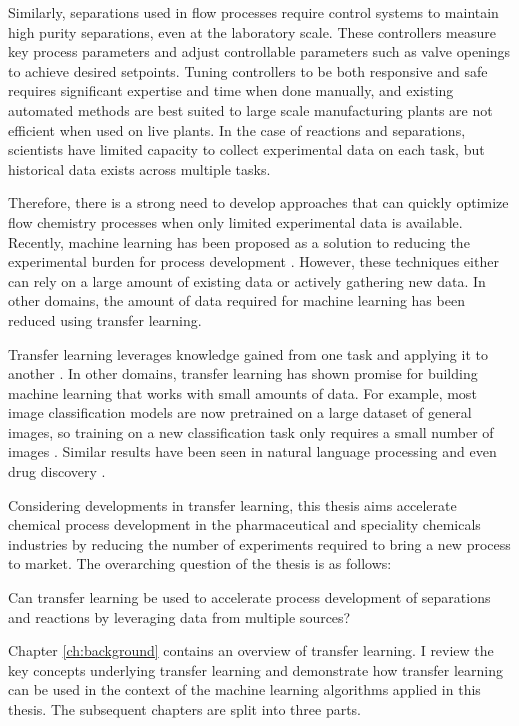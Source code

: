 Similarly, separations used in flow processes require control systems to maintain high purity separations, even at the laboratory scale. These controllers measure key process parameters and adjust controllable parameters such as valve openings to achieve desired setpoints. Tuning controllers to be both responsive and safe requires significant expertise and time when done manually, and existing automated methods are best suited to large scale manufacturing plants are not efficient when used on live plants. In the case of reactions and separations, scientists have limited capacity to collect experimental data on each task, but historical data exists across multiple tasks.

Therefore, there is a strong need to develop approaches that can quickly optimize flow chemistry processes when only limited experimental data is available. Recently, machine learning has been proposed as a solution to reducing the experimental burden for process development \cite{Taylor2023a}.  However, these techniques either can rely on a large amount of existing data or actively gathering new data.  In other domains, the amount of data required for machine learning has been reduced using transfer learning. 

Transfer learning leverages knowledge gained from one task and applying it to another \cite{Zhuang2021}. In other domains, transfer learning has shown promise for building machine learning that works with small amounts of data. For example, most image classification models are now pretrained on a large dataset of general images, so training on a new classification task only requires a small number of images \cite{He2016}. Similar results have been seen in natural language processing \cite{Brown2020} and even drug discovery \cite{Ramsundar2017}. 

Considering developments in transfer learning, this thesis aims accelerate chemical process development in the pharmaceutical and speciality chemicals industries by reducing the number of experiments required to bring a new process to market. The overarching question of the thesis is as follows:
\begin{displayquote}
Can transfer learning be used to accelerate process development of separations and reactions by leveraging data from multiple sources? 
\end{displayquote}
Chapter \ref{ch:background} contains an overview of transfer learning. I review the key concepts underlying transfer learning and demonstrate how transfer learning can be used in the context of the machine learning algorithms applied in this thesis.  The subsequent chapters are split into three parts.


